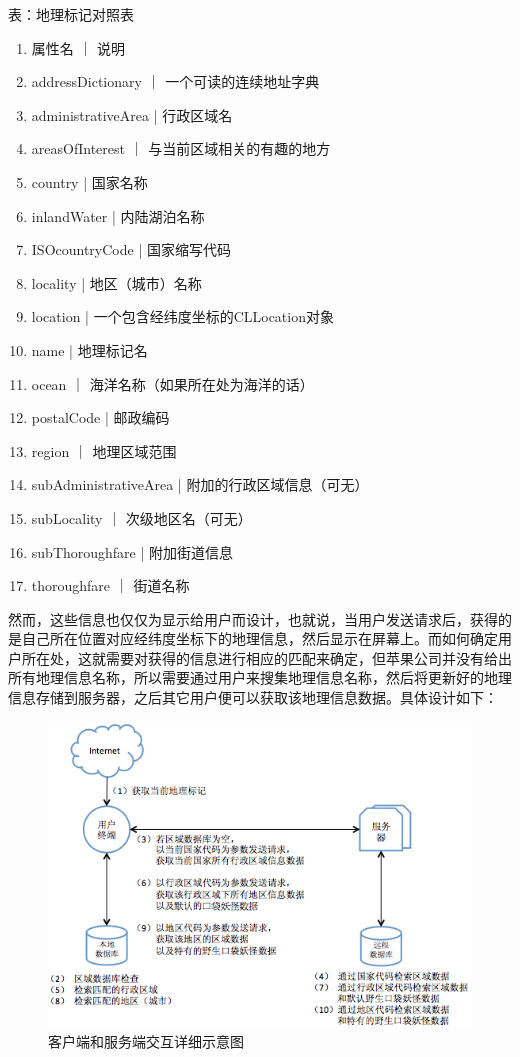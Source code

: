 \documentclass{article}
\begin{document}
\begin{CJK}{UTF8}{gbsn}
  表：地理标记对照表
  \begin{enumerate}
		\item 属性名 ｜ 说明
		\item addressDictionary ｜ 一个可读的连续地址字典
		\item administrativeArea | 行政区域名
		\item areasOfInterest ｜ 与当前区域相关的有趣的地方
		\item country | 国家名称
		\item inlandWater | 内陆湖泊名称
		\item ISOcountryCode | 国家缩写代码
		\item locality | 地区（城市）名称
		\item location | 一个包含经纬度坐标的CLLocation对象
		\item name | 地理标记名
		\item ocean ｜ 海洋名称（如果所在处为海洋的话）
		\item postalCode | 邮政编码
		\item region ｜ 地理区域范围
		\item subAdministrativeArea | 附加的行政区域信息（可无）
		\item subLocality ｜ 次级地区名（可无）
		\item subThoroughfare | 附加街道信息
		\item thoroughfare ｜ 街道名称
  \end{enumerate}
  
  然而，这些信息也仅仅为显示给用户而设计，也就说，当用户发送请求后，获得的是自己所在位置对应经纬度坐标下的地理信息，然后显示在屏幕上。而如何确定用户所在处，这就需要对获得的信息进行相应的匹配来确定，但苹果公司并没有给出所有地理信息名称，所以需要通过用户来搜集地理信息名称，然后将更新好的地理信息存储到服务器，之后其它用户便可以获取该地理信息数据。具体设计如下：

   \begin{figure}[htbp]
		\centering
		\includegraphics[bb=0 0 749 669, scale=0.45]{figure/fig_n19.png}
		\caption{客户端和服务端交互详细示意图}
		\label{fig:n19}
	\end{figure}


\end{CJK}
\end{document}
